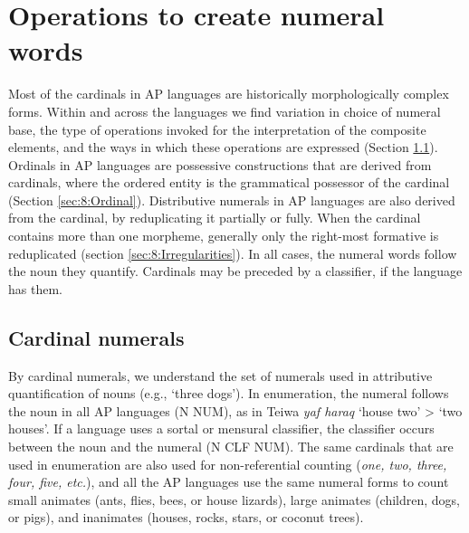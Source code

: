 \section{Operations to create numeral words} 
\label{sec:8:Operations}
Most of the cardinals in AP languages are historically morphologically complex forms. Within and across the languages we find variation in choice of numeral base, the type of operations invoked for the interpretation of the composite elements, and the ways in which these operations are expressed (Section \ref{sec:8:Cardinal}). Ordinals in AP languages are possessive constructions that are derived from cardinals, where the ordered entity is the grammatical possessor of the cardinal (Section \ref{sec:8:Ordinal}). Distributive numerals in AP languages are also derived from the cardinal, by reduplicating it partially or fully. When the cardinal contains more than one morpheme, generally only the right-most formative is reduplicated (section \ref{sec:8:Irregularities}).  In all cases, the numeral words follow the noun they quantify. Cardinals may be preceded by a classifier, if the language has them. 

\subsection{Cardinal numerals}
\label{sec:8:Cardinal}
By cardinal numerals, we understand the set of numerals used in attributive quantification of nouns (e.g., `three dogs'). In enumeration, the numeral follows the noun in all AP languages (N NUM), as in Teiwa \textit{yaf haraq} `house two' {\textgreater} `two houses'. If a language uses a sortal or mensural classifier, the classifier occurs between the noun and the numeral (N CLF NUM). The same cardinals that are used in enumeration are also used for non-referential counting (\textit{one, two, three, four, five, etc.}), and all the AP languages use the same numeral forms to count small animates (ants, flies, bees, or house lizards), large animates (children, dogs, or pigs), and inanimates (houses, rocks, stars, or coconut trees).


